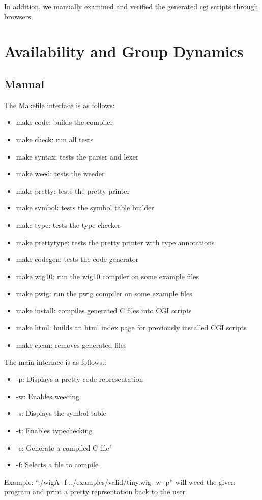 \documentclass{WigReport}
\begin{document}
In addition, we manually examined and verified the generated cgi scripts through browsers.


\section{Availability and Group Dynamics}
\subsection{Manual}
The Makefile interface is as follows:
\begin{itemize}
\item make code: builds the compiler
\item make check: run all tests
\item make syntax: tests the parser and lexer
\item make weed: tests the weeder
\item make pretty: tests the pretty printer
\item make symbol: tests the symbol table builder
\item make type: tests the type checker
\item make prettytype: tests the pretty printer with type annotations
\item make codegen: tests the code generator
\item make wig10: run the wig10 compiler on some example files
\item make pwig: run the pwig compiler on some example files
\item make install: compiles generated C files into CGI scripts
\item make html: builds an html index page for previously installed CGI scripts
\item make clean: removes generated files
\end{itemize}
The main interface is as follows.:
\begin{itemize}
\item-p: Displays a pretty code representation
\item-w: Enables weeding
\item-s: Displays the symbol table
\item-t: Enables typechecking
\item-c: Generate a compiled C file"
\item-f: Selects a file to compile
\end{itemize}
Example: ``./wigA -f ../examples/valid/tiny.wig -w -p'' will weed the given program and print a pretty reprsentation back to the user
\end{document}
